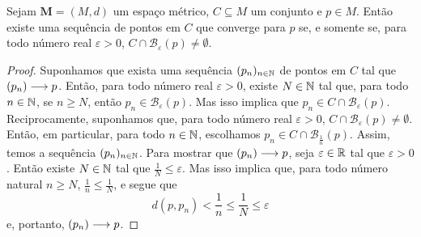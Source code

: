\begin{prop}
	Sejam $\bm M = (M,d)$ um espaço métrico, $C \subseteq M$ um conjunto e $p \in M$. Então existe uma sequência de pontos em $C$ que converge para $p$ se, e somente se, para todo número real $\varepsilon > 0$, $C \cap \mathcal B_\varepsilon(p) \neq \emptyset$.
\end{prop}
\begin{proof}
	Suponhamos que exista uma sequência $(p_n)_{n \in \mathbb{N}}$ de pontos em $C$ tal que $(p_n) \longrightarrow p$. Então, para todo número real $\varepsilon > 0$, existe $N \in \mathbb{N}$ tal que, para todo $n \in \mathbb{N}$, se $n \geq N$, então $p_n \in \mathcal B_\varepsilon(p)$. Mas isso implica que $p_n \in C \cap \mathcal B_\varepsilon(p)$. Reciprocamente, suponhamos que, para todo número real $\varepsilon > 0$, $C \cap \mathcal B_\varepsilon(p) \neq \emptyset$. Então, em particular, para todo $n \in \mathbb{N}$, escolhamos $p_n \in C \cap \mathcal B_{\frac{1}{n}}(p)$. Assim, temos a sequência $(p_n)_{n \in \mathbb{N}}$. Para mostrar que $(p_n) \longrightarrow p$, seja $\varepsilon \in \mathbb{R}$ tal que $\varepsilon > 0$. Então existe $N \in \mathbb{N}$ tal que $\frac{1}{N} \leq \varepsilon$. Mas isso implica que, para todo número natural $n \geq N$, $\frac{1}{n} \leq \frac{1}{N}$, e segue que
	\begin{equation*}
	d(p,p_n) < \frac{1}{n} \leq \frac{1}{N} \leq \varepsilon
	\end{equation*}
e, portanto, $(p_n) \longrightarrow p$.
\end{proof}

